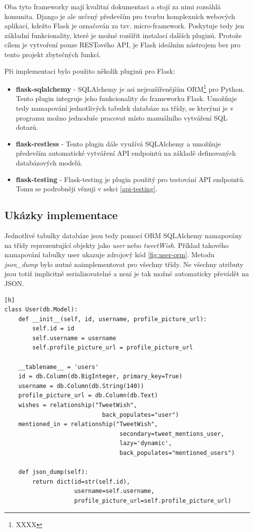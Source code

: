 \documentclass[thesis=B,czech]{FITthesis}[2012/06/26]
\begin{document}
	Oba tyto frameworky mají kvalitní dokumentaci a stojí za nimi rozsáhlá komunita. Django je ale určený především pro tvorbu komplexních webových aplikací, kdežto Flask je označován za tzv. micro-framework. Poskytuje tedy jen základní funkcionality, které je možné rozšířit instalací dalších pluginů. Protože cílem je vytvoření pouze RESTového API, je Flask ideálním nástrojem bez pro tento projekt zbytečných funkcí. 
	
\noindent Při implementaci bylo použito několik pluginů pro Flask:
	
\begin{itemize}
\item \textbf{flask-sqlalchemy} - SQLAlchemy je asi nejrozšířenějším ORM\footnote{XXXX} pro Python. Tento plugin integruje jeho funkcionality do frameworku Flask. Umožňuje tedy namapování jednotlivých tabulek databáze na třídy, se kterými je v programu možno jednoduše pracovat místo manuálního vytváření SQL dotazů. 
\item \textbf{flask-restless} - Tento plugin dále využívá SQLAlchemy a umožňuje především automatické vytváření API endpointů na základě definovaných databázových modelů. 
\item \textbf{flask-testing} - Flask-testing je plugin použitý pro testování API endpointů. Tomu se podrobněji věnuji v sekci \ref{api-testing}.
\end{itemize}

\subsection{Ukázky implementace}
Jednotlivé tabulky databáze jsou tedy pomocí ORM SQLAlchemy namapovány na třídy reprezentující objekty jako \textit{user} nebo \textit{tweetWish}. Příklad takového namapování tabulky user ukazuje zdrojový kód \ref{fig:user-orm}. Metodu \textit{json\_dump} bylo nutné naimplementovat pro všechny třídy. Ne všechny atributy jsou totiž implicitně serializovatelné a není je tak možné automaticky převádět na JSON. 

\begin{lstlisting}[caption={Ukázka použití ORM SQLAlchemy},label=fig:user-orm][h]
class User(db.Model):
	def __init__(self, id, username, profile_picture_url):
		self.id = id
		self.username = username
		self.profile_picture_url = profile_picture_url

	__tablename__ = 'users'
	id = db.Column(db.BigInteger, primary_key=True)
	username = db.Column(db.String(140))
	profile_picture_url = db.Column(db.Text)
	wishes = relationship("TweetWish",
							back_populates="user")
	mentioned_in = relationship("TweetWish",
    							 secondary=tweet_mentions_user,
								 lazy='dynamic',
								 back_populates="mentioned_users")

	def json_dump(self):
		return dict(id=str(self.id),
					username=self.username,
					profile_picture_url=self.profile_picture_url)
\end{lstlisting}
\end{document}
